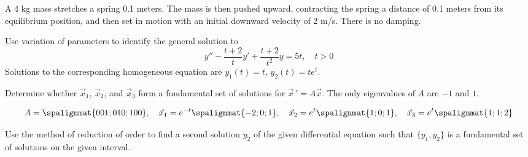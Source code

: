 \documentclass[12pt]{exam}
\begin{document}
\begin{questions}
    \question[11] A 4 kg mass stretches a spring 0.1 meters. The mass is then pushed upward, contracting the spring a distance of 0.1 meters from its equilibrium position, and then set in motion with an initial downward velocity of 2 m/s. There is no damping. 

    \newpage \InitialsLeft

    \question[8] Use variation of parameters to identify the general solution to $$y'' - \frac{t+2}{t}y' + \frac{t+2}{t^2}y = 5t, \quad t > 0$$ Solutions to the corresponding homogeneous equation are $y_1(t) = t$, $y_2(t) = te^t$. 
    
    
    \newpage \InitialsLeft
    
    \question[3] Determine whether $\vec x_1$, $\vec x_2$, and $\vec x_3$ form a fundamental set of solutions for $\vec x \, ' = A\vec x$. The only eigenvalues of $A$ are $-1$ and $1$.
    
    $$A = \spalignmat{0 0 1;0 1 0;1 0 0}, \quad \vec x_1 = e^{-t}\spalignmat{-2;0;1}, \quad \vec x_2 = e^{t}\spalignmat{1;0;1}, \quad \vec x_3 = e^{t}\spalignmat{1;1;2} $$
    
    \vspace{5cm}
    
    \newpage \InitialsLeft
    
    \question[7] Use the method of reduction of order to ﬁnd a second solution $y_2$ of the given diﬀerential equation such that $\{ y_1 , y_2 \}$ is a fundamental set of solutions on the given interval.
    

\end{questions}
\end{document}
